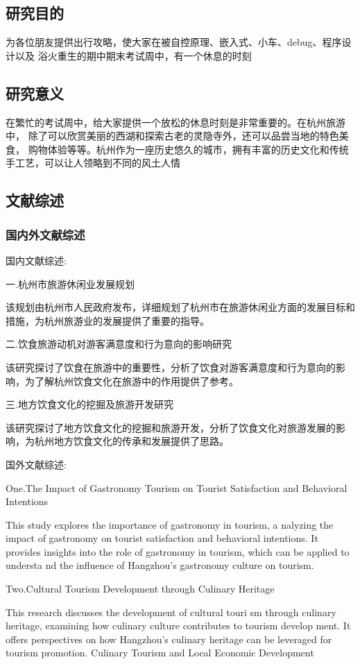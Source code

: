 \documentclass[a4paper,12pt]{article}
\begin{document}
\subsection{研究目的}
为各位朋友提供出行攻略，使大家在被自控原理、嵌入式、小车、debug、程序设计以及
浴火重生的期中期末考试周中，有一个休息的时刻
\subsection{研究意义}
在繁忙的考试周中，给大家提供一个放松的休息时刻是非常重要的。在杭州旅游中，
除了可以欣赏美丽的西湖和探索古老的灵隐寺外，还可以品尝当地的特色美食，
购物体验等等。杭州作为一座历史悠久的城市，拥有丰富的历史文化和传统手工艺，可以让人领略到不同的风土人情
\subsection{文献综述}
\subsubsection{国内外文献综述}
国内文献综述:

一.杭州市旅游休闲业发展规划

该规划由杭州市人民政府发布，详细规划了杭州市在旅游休闲业方面的发展目标和措施，为杭州旅游业的发展提供了重要的指导。

二.饮食旅游动机对游客满意度和行为意向的影响研究

该研究探讨了饮食在旅游中的重要性，分析了饮食对游客满意度和行为意向的影响，为了解杭州饮食文化在旅游中的作用提供了参考。

三.地方饮食文化的挖掘及旅游开发研究

该研究探讨了地方饮食文化的挖掘和旅游开发，分析了饮食文化对旅游发展的影响，为杭州地方饮食文化的传承和发展提供了思路。

国外文献综述:

One.The Impact of Gastronomy Tourism on Tourist Satisfaction and Behavioral Intentions

This study explores the importance of gastronomy in tourism, a
nalyzing the impact of gastronomy on tourist satisfaction and behavioral intentions. It 
provides insights into the role of gastronomy in tourism, which can be applied to understa
nd the influence of Hangzhou's gastronomy culture on tourism.

Two.Cultural Tourism Development through Culinary Heritage

This research discusses the development of cultural touri
sm through culinary heritage, examining how culinary culture contributes to tourism develop
ment. It offers perspectives on how Hangzhou's culinary heritage can be leveraged for tourism promotion.
Culinary Tourism and Local Economic Development
\end{document}
